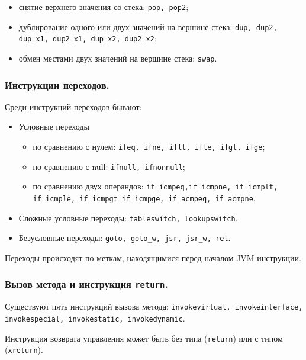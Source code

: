 \begin{itemize}
\item снятие верхнего значения со стека: \texttt{pop, pop2};
\item дублирование одного или двух значений на вершине стека: \texttt{dup, dup2, dup\_x1, dup2\_x1, dup\_x2, dup2\_x2};
\item обмен местами двух значений на вершине стека: \texttt{swap}.
\end {itemize}

\subsubsection{Инструкции переходов.}
Среди инструкций переходов бывают:
\begin{itemize}
\item Условные переходы
\begin{itemize}
\item по сравнению с нулем: \texttt{ifeq, ifne, iflt, ifle, ifgt, ifge};
\item по сравнению с null: \texttt{ifnull, ifnonnull};
\item по сравнению двух операндов: \texttt{if\_icmpeq,if\_icmpne, if\_icmplt, if\_icmple, if\_icmpgt if\_icmpge, if\_acmpeq, if\_acmpne}.
\end{itemize}
\item Сложные условные переходы: \texttt{tableswitch, lookupswitch}.
\item Безусловные переходы: \texttt{goto, goto\_w, jsr, jsr\_w, ret}.
\end{itemize}
Переходы происходят по меткам, находящимися перед началом JVM-инструкции.

\subsubsection{Вызов метода и инструкция \texttt{return}.}
Существуют пять инструкций вызова метода: \texttt{invokevirtual, invokeinterface, invokespecial, invokestatic, invokedynamic}.

Инструкция возврата управления может быть без типа (\texttt{return}) или с типом (\texttt{xreturn}).

